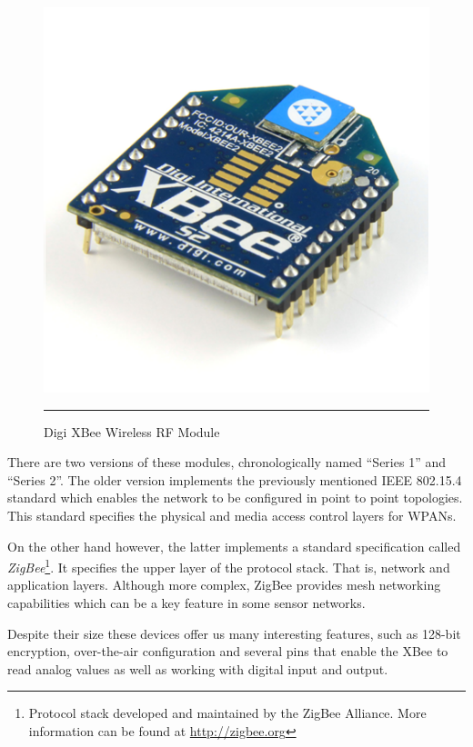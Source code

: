 \begin{figure}[htbp]
    \centering
    \includegraphics[scale=0.4]{./Figures/xbee.png}
        \rule{35em}{0.5pt}
        \caption[Digi XBee RF Module]{Digi XBee\textregistered{} Wireless RF Module}
    \label{fig:XBee RF Module}
\end{figure}

There are two versions of these modules, chronologically named ``Series 1'' and ``Series 2''. The older version implements the previously mentioned IEEE 802.15.4 standard which enables the network to be configured in point to point topologies. This standard specifies the physical and media access control layers for WPANs.

On the other hand however, the latter implements a standard specification called \emph{ZigBee}\footnote{Protocol stack developed and maintained by the ZigBee Alliance. More information can be found at \url{http://zigbee.org}}. It specifies the upper layer of the protocol stack. That is, network and application layers. Although more complex, ZigBee provides mesh networking capabilities which can be a key feature in some sensor networks.

Despite their size these devices offer us many interesting features, such as 128-bit encryption, over-the-air configuration and several pins that enable the XBee to read analog values as well as working with digital input and output\cite{xbeedatasheet}.

